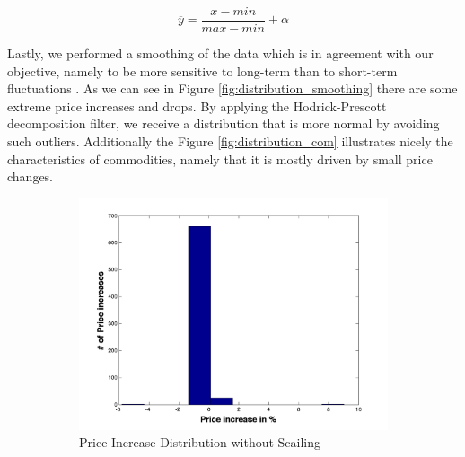 \begin{equation} \label{eq:normalize}
\overline{ y } = \frac{x - min}{max - min}  + \alpha \end{equation}


Lastly, we performed a smoothing of the data which is in agreement with our objective, namely to be more sensitive to long-term than to short-term fluctuations \cite{edward81}. As we can see in Figure \ref{fig:distribution_smoothing} there are some extreme price increases and drops. By applying the Hodrick-Prescott decomposition \cite{edward81} filter, we receive a distribution that is more normal by avoiding such outliers. Additionally the Figure \ref{fig:distribution_com} illustrates nicely the characteristics of commodities, namely that it is mostly driven by small price changes. 


\begin{figure}[ht]
        \centering
        \begin{subfigure}[b]{0.5\textwidth}
                \includegraphics[width=\textwidth]{img/model/p_increase_n_log}
                \caption{Price Increase Distribution without Scailing}
                \label{fig:}
        \end{subfigure}%
        ~ %
        \begin{subfigure}[b]{0.5\textwidth}

\end{subfigure}
\end{figure}
